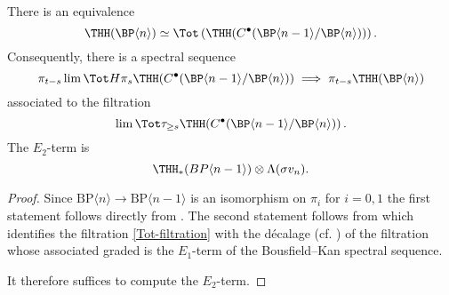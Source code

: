 \begin{proposition}
There is an equivalence 
\[ 
	\THH(\BP\langle n \rangle)\simeq \Tot \left ( \THH(C^{\bullet}(\BP\langle n-1\rangle/\BP\langle n\rangle)) \right ).
\]
Consequently, there is a spectral sequence 
\[ 
	\pi_{t-s}\lim \Tot H\pi_s\THH(C^{\bullet}(\BP\langle n-1\rangle/\BP\langle n\rangle))\implies \pi_{t-s}\THH(\BP\langle n\rangle)
\]
associated to the filtration 
\begin{equation}\label{Tot-filtration}
	\lim \Tot \tau_{\ge s}\THH(C^{\bullet}(\BP\langle n-1\rangle/\BP\langle n\rangle))\,.
\end{equation}
The $E_2$-term is
\[ \THH_*(BP\langle n-1\rangle)\otimes \Lambda (\sigma v_n).\]
\end{proposition}
\begin{proof}
Since $\mathrm{BP}\langle n\rangle\to \mathrm{BP}\langle n-1\rangle$ is an isomorphism on $\pi_i$ for $i=0,1$ the first statement follows directly from \cite[Theorem 3.7]{DR18}. 
The second statement follows from \cite[Remark 3.7]{GIKR22} which identifies the filtration \eqref{Tot-filtration} with the d\'ecalage (cf. \cite[pp. 21]{Del71}) of the filtration whose associated graded is the $E_{1}$-term of the Bousfield--Kan spectral sequence. 

It therefore suffices to compute the $E_{2}$-term.
\end{proof}
